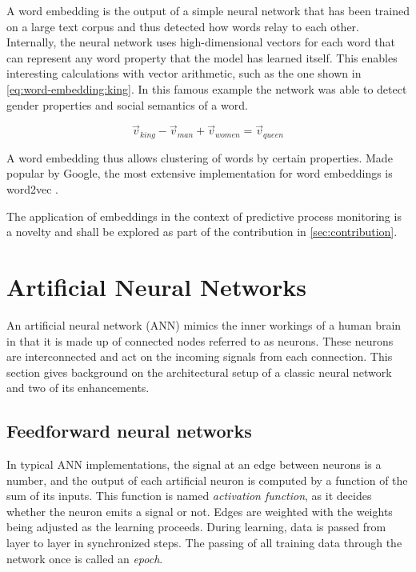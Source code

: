 A word embedding is the output of a simple neural network that has been trained on a large text corpus and thus detected how words relay to each other. Internally, the neural network uses high-dimensional vectors for each word that can represent any word property that the model has learned itself. This enables interesting calculations with vector arithmetic, such as the one shown in \autoref{eq:word-embedding:king}. In this famous example the network was able to detect gender properties and social semantics of a word. 

\begin{equation}
    \label{eq:word-embedding:king}
    \vec{v}_{king} - \vec{v}_{man} + \vec{v}_{women} = \vec{v}_{queen}
\end{equation}

A word embedding thus allows clustering of words by certain properties.
Made popular by Google, the most extensive implementation for word embeddings is word2vec \cite{web:ahogrammer, goldberg2014word2vec}.

The application of embeddings in the context of predictive process monitoring is a novelty and shall be explored as part of the contribution in \autoref{sec:contribution}.

\section{Artificial Neural Networks}
An artificial neural network (ANN) mimics the inner workings of a human brain in that it is made up of connected nodes referred to as neurons. These neurons are interconnected and act on the incoming signals from each connection. This section gives background on the architectural setup of a classic neural network and two of its enhancements.

\subsection{Feedforward neural networks}
In typical ANN implementations, the signal at an edge between neurons is a number, and the output of each artificial neuron is computed by a function of the sum of its inputs. This function is named \textit{activation function}, as it decides whether the neuron emits a signal or not. Edges are weighted with the weights being adjusted as the learning proceeds. During learning, data is passed from layer to layer in synchronized steps. The passing of all training data through the network once is called an \textit{epoch}.

